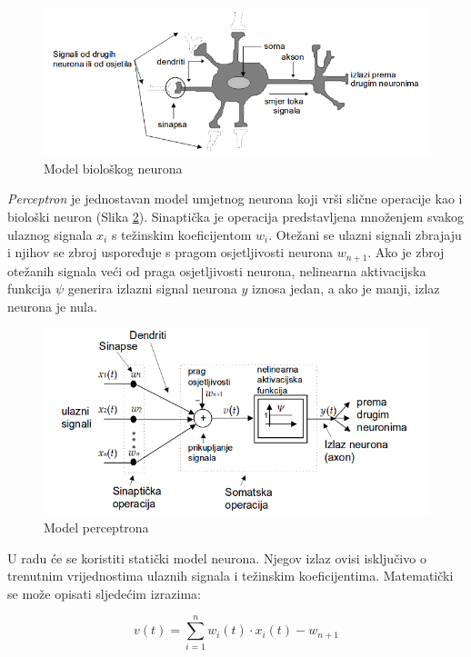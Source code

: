 \documentclass[times, utf8, diplomski]{fer}
\begin{document}
\begin{figure}[h]
\centering
\includegraphics[width=.9\textwidth]{bio_neuron}
\caption{Model biološkog neurona \protect\footnotemark[10]}
\label{fig:bio-neuron}
\end{figure}

\textit{Perceptron} je jednostavan model umjetnog neurona koji vrši slične operacije kao i biološki neuron (Slika \ref{fig:neuron}). Sinaptička je operacija predstavljena množenjem svakog ulaznog signala $x_i$ s težinskim koeficijentom $w_i$. Otežani se ulazni signali zbrajaju i njihov se zbroj uspoređuje s pragom osjetljivosti neurona $w_{n+1}$. Ako je zbroj otežanih signala veći od praga osjetljivosti neurona, nelinearna aktivacijska funkcija $\psi$ generira izlazni signal neurona $y$ iznosa jedan, a ako je manji, izlaz neurona je nula.

\begin{figure}[h]
\centering
\includegraphics[width=.9\textwidth]{neuron}
\caption{Model perceptrona \protect\footnotemark[10]}
\label{fig:neuron}
\end{figure}

U radu će se koristiti statički model neurona. Njegov izlaz ovisi isključivo o trenutnim vrijednostima ulaznih signala i težinskim koeficijentima. Matematički se može opisati sljedećim izrazima:

\begin{equation}
v(t) = \sum_{i=1}^{n}w_i(t)\cdot x_i(t) - w_{n+1}
\end{equation}
\end{document}
